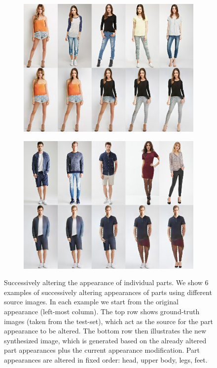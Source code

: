 \begin{figure}[b!]
	\centering
	\begin{subfigure}{.43\linewidth}
	\centering
	\includegraphics[trim={0cm 0cm 0cm 0cm},clip, width=1.\linewidth]{fig/supp/DeepF/3}
	\label{fig:part3_30}
	\end{subfigure}\hspace{0.03\textwidth}
	\centering
	\begin{subfigure}{.43\linewidth}
	\centering
	\includegraphics[trim={0cm 0cm 0cm 0cm},clip, width=1.\linewidth]{fig/supp/DeepF/7}
	\label{fig:part3_30}
	\end{subfigure}
	\caption{
	Successively altering the appearance of individual parts. We show 6 examples of successively altering appearances of parts using different source images. In each example we start from the original appearance (left-most column). The top row shows ground-truth images (taken from the test-set), which act as the source for the part appearance to be altered. The bottom row then illustrates the new synthesized image, which is generated based on the already altered part appearances plus the current appearance modification. Part appearances are altered in fixed order: head, upper body, legs, feet.
	}
	\label{fig:partswaps}
\end{figure}

